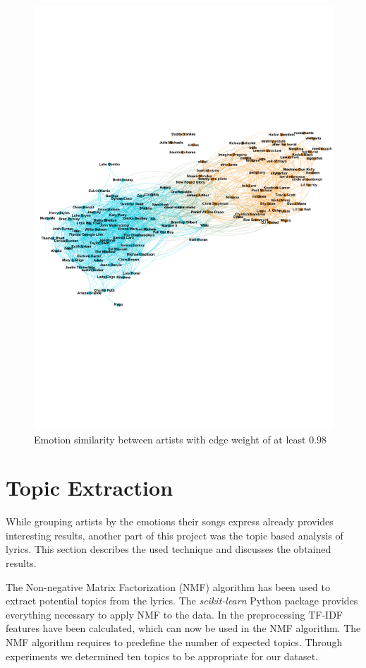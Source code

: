 \documentclass[10pt,a4paper]{article}
\begin{document}
		\begin{figure}[htb]
			\centering
			\includegraphics[trim=0mm 80mm 0mm 85mm, clip, width=0.8\linewidth]{data/emotion_similarity}
			\caption{Emotion similarity between artists with edge weight of at least $0.98$}
			\label{fig:emotionsimilarity}
		\end{figure}
	
	\section{Topic Extraction}
	\label{sec:topicextraction}
	While grouping artists by the emotions their songs express already provides interesting results, another part of this project was the topic based analysis of lyrics. This section describes the used technique and discusses the obtained results.
	
	The Non-negative Matrix Factorization (NMF) algorithm has been used to extract potential topics from the lyrics. The \textit{scikit-learn} Python package provides everything necessary to apply NMF to the data. In the preprocessing TF-IDF features have been calculated, which can now be used in the NMF algorithm. The NMF algorithm requires to predefine the number of expected topics. Through experiments we determined ten topics to be appropriate for our dataset. 
	
\end{document}
